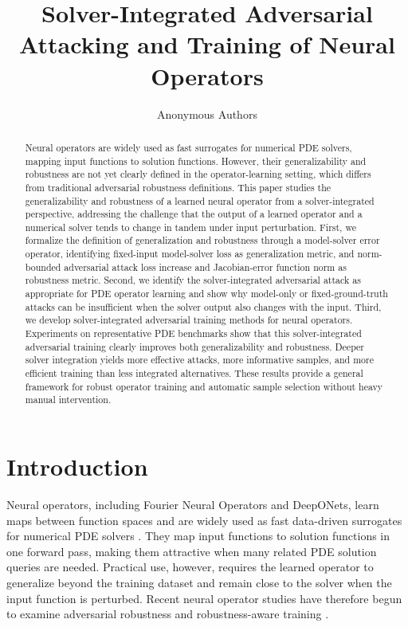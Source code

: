 \documentclass[letterpaper]{article} %
\title{Solver-Integrated Adversarial Attacking and Training of Neural Operators}
\author{Anonymous Authors}
\begin{document}
\maketitle
\thispagestyle{plain}
\pagestyle{plain}
\begin{abstract}
Neural operators are widely used as fast surrogates for numerical PDE
solvers, mapping input functions to solution functions. However, their
generalizability and robustness are not yet clearly defined in the
operator-learning setting, which differs from traditional adversarial robustness
definitions. This paper studies the generalizability and robustness of a
learned neural operator from a solver-integrated perspective, addressing the
challenge that the output of a learned operator and a numerical solver tends to
change in tandem under input perturbation. First, we formalize the definition
of generalization and robustness through a model-solver error operator,
identifying fixed-input model-solver loss as generalization metric, and
norm-bounded adversarial attack loss increase and Jacobian-error function norm as
robustness metric. Second, we
identify the solver-integrated adversarial attack as appropriate
for PDE operator learning and show why model-only or fixed-ground-truth attacks
can be insufficient when the solver output also changes with the input. Third, we
develop solver-integrated adversarial training methods for neural operators.
Experiments on representative PDE benchmarks show that this solver-integrated
adversarial training clearly improves both generalizability and robustness.
Deeper solver integration yields more effective attacks, more informative
samples, and more efficient training than less integrated alternatives. These
results provide a general
framework for robust operator training and automatic sample selection without
heavy manual intervention.
\end{abstract}

\section{Introduction}

Neural operators, including Fourier Neural Operators and DeepONets, learn maps
between function spaces and are widely used as fast data-driven
surrogates for numerical PDE solvers \citep{li2021fourier,lu2021deeponet}.
They map input functions to solution functions in one forward pass, making them
attractive when many related PDE solution queries are needed. Practical use, however,
requires the learned operator to generalize beyond the training dataset and
remain close to the solver when the input function is perturbed. Recent neural
operator studies have therefore begun to examine adversarial robustness and
robustness-aware training
\citep{adesoji2022evaluating,huang2026stablepdenet,roy2026beyond}.
\end{document}
